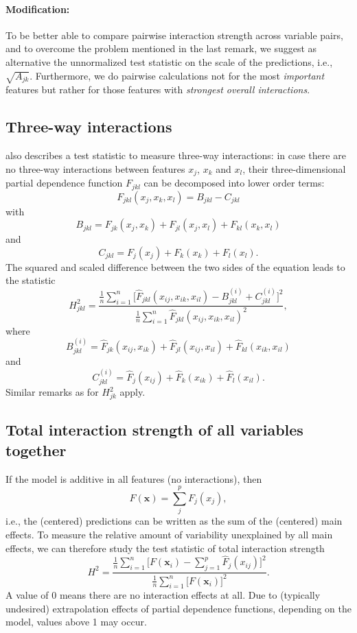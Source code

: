 \documentclass[]{article}
\begin{document}
\paragraph{Modification:} To be better able to compare pairwise interaction strength across variable pairs, and to overcome the problem mentioned in the last remark, we suggest as alternative the unnormalized test statistic on the scale of the predictions, i.e., $\sqrt{A_{jk}}$. 
Furthermore, we do pairwise calculations not for the most {\em important} features but rather for those features with {\em strongest overall interactions}.

\subsection{Three-way interactions}
\cite{friedman2008} also describes a test statistic to measure three-way interactions: in case there are no three-way interactions between features $x_j$, $x_k$ and $x_l$, their three-dimensional partial dependence function $F_{jkl}$ can be decomposed into lower order terms:
$$
  F_{jkl}(x_j, x_k, x_l) = B_{jkl} - C_{jkl}
$$
with
$$
  B_{jkl} = F_{jk}(x_j, x_k) + F_{jl}(x_j, x_l) + F_{kl}(x_k, x_l)
$$
and
$$
  C_{jkl} =  F_j(x_j) + F_k(x_k) + F_l(x_l).
$$
The squared and scaled difference between the two sides of the equation leads to the statistic
$$
  H_{jkl}^2 = \frac{\frac{1}{n} \sum_{i = 1}^n \big[\hat F_{jkl}(x_{ij}, x_{ik}, x_{il}) - B^{(i)}_{jkl} + C^{(i)}_{jkl}\big]^2}{\frac{1}{n} \sum_{i = 1}^n \hat F_{jkl}(x_{ij}, x_{ik}, x_{il})^2},
$$
where 
$$
  B^{(i)}_{jkl} = \hat F_{jk}(x_{ij}, x_{ik}) + \hat F_{jl}(x_{ij}, x_{il}) + \hat F_{kl}(x_{ik}, x_{il})
$$
and
$$
  C^{(i)}_{jkl} = \hat F_j(x_{ij}) + \hat F_k(x_{ik}) + \hat F_l(x_{il}).
$$
Similar remarks as for $H^2_{jk}$ apply.

\subsection{Total interaction strength of all variables together}
If the model is additive in all features (no interactions), then
$$
	F(\mathbf{x}) = \sum_{j}^{p} F_j(x_j),
$$
i.e., the (centered) predictions can be written as the sum of the (centered) main effects.
To measure the relative amount of variability unexplained by all main effects, we can therefore study the test statistic of total interaction strength
$$
  H^2 = \frac{\frac{1}{n} \sum_{i = 1}^n \big[F(\mathbf{x}_i) - \sum_{j = 1}^p\hat F_j(x_{ij})\big]^2}{\frac{1}{n} \sum_{i = 1}^n\big[F(\mathbf{x}_i)\big]^2}.
$$
A value of 0 means there are no interaction effects at all. Due to (typically undesired) extrapolation effects of partial dependence functions, depending on the model, values above 1 may occur.
\end{document}
